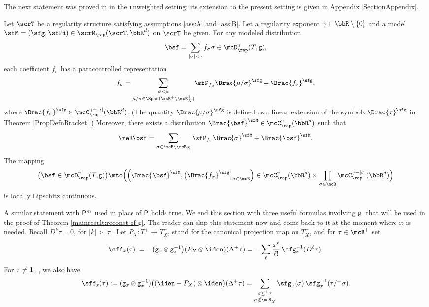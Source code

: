 The next statement was proved in \cite[Th.\,14]{BH} in the unweighted setting; its extension to the present setting is given in Appendix \ref{SectionAppendix}.

\begin{thm} \label{thm:MD to PD}
Let $\scrT$ be a regularity structure satisfying assumptions \eqref{ass:A} and \eqref{ass:B}. Let a regularity exponent $\gamma\in\bbR\setminus\{0\}$ and a model $\sfM=(\sfg,\sfPi)\in\scrM_\rap(\scrT,\bbR^d)$ on $\scrT$ be given. For any modeled distribution
\[
\bsf=\sum_{|\sigma|<\gamma}f_\sigma\sigma\in\mcD_\rap^\gamma(T,\sf g),
\]
each coefficient $f_\sigma$ has a paracontrolled representation
\begin{align}\label{eq:para system}
f_\sigma = \underset{\mu/\sigma\in\Span(\mcB^+\setminus\mcB_X^+)}{\sum_{\sigma<\mu}} \sfP_{f_\mu}\Brac{\mu/\sigma}^\sfg + \Brac{f_\sigma}^\sfg,
\end{align}
where $\Brac{f_\sigma}^\sfg\in \mcC_\rap^{\gamma-|\sigma|}(\bbR^d)$. (The quantity $\Brac{\mu/\sigma}^{\sfg}$ is defined as a linear extension of the symbols $\Brac{\tau}^{\sfg}$ in Theorem \ref{PropDefnBracket}.) Moreover, there exists a distribution $\Brac{\bsf}^\sfM\in \mcC_\rap^\gamma(\bbR^d)$ such that
\begin{align}\label{eq:para reconst}
\reR\bsf=\sum_{\sigma\in\mcB\setminus\mcB_{\underline{X}}} \sfP_{f_\sigma}\Brac{\sigma}^\sfM+\Brac{\bsf}^\sfM.
\end{align}
The mapping
\[
\bigl(\bsf\in\mcD_\rap^\gamma(T,{\sf g})\bigr)\mto \Bigl( \Bigl(\Brac{\bsf}^\sfM,\bigl(\Brac{f_\sigma}^\sfg\bigr)_{\sigma\in\mcB}\Bigr) \in \mcC^\gamma_\rap(\bbR^d)\times\prod_{\sigma\in\mcB} \mcC^{\gamma-\vert\sigma\vert}_\rap(\bbR^d) \Bigr)
\]
is locally Lipschitz continuous.
\end{thm}

A similar statement with ${\sf P}^m$ used in place of $\sf P$ holds true. We end this section with three useful formulas involving $\sf g$, that will be used in the proof of Theorem \ref{mainresult:reconst of g}. The reader can skip this statement now and come back to it at the moment where it is needed. Recall $D^k\tau=0$, for $\vert k\vert>\vert\tau\vert$. Let $P_X: T^+\to T^+_X$, stand for the canonical projection map on $T^+_X$, and for $\tau\in\mcB^+$ set
\begin{equation*}
\sff_x(\tau) := - \bigl({\sf g}_x\otimes {\sf g}_x^{-1}\bigr)(P_X\otimes\iden)(\Delta^+\tau) 
 = - \sum_{\ell}\frac{x^\ell}{\ell!} \, \sfg_x^{-1}(D^\ell\tau).
\end{equation*}
For $\tau\neq {\bf 1}_+$, we also have
\begin{equation*}
\sff_x(\tau) := ({\sf g}_x\otimes {\sf g}_x^{-1}) \bigl((\iden-P_X)\otimes\iden\bigr)
(\Delta^+\tau) = \sum_{\substack{\sigma\leq^+\tau\\\sigma\notin\mcB_X^+}} \sfg_x(\sigma)\,\sfg_x^{-1}(\tau/^+\sigma).
\end{equation*}

